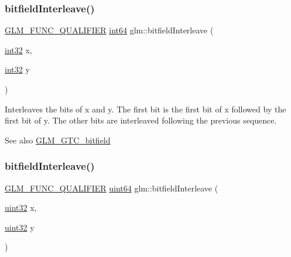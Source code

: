 \subsubsection{\texorpdfstring{bitfield\+Interleave()}{bitfieldInterleave()}\hspace{0.1cm}{\footnotesize\ttfamily [5/16]}}
{\footnotesize\ttfamily \mbox{\hyperlink{setup_8hpp_a33fdea6f91c5f834105f7415e2a64407}{G\+L\+M\+\_\+\+F\+U\+N\+C\+\_\+\+Q\+U\+A\+L\+I\+F\+I\+ER}} \mbox{\hyperlink{group__gtc__type__precision_ga435d75819cce297cc5fa21bd84ef89a5}{int64}} glm\+::bitfield\+Interleave (\begin{DoxyParamCaption}\item[{\mbox{\hyperlink{group__gtc__type__precision_ga632d8b25f6b61659f39ea4321fab92a4}{int32}}}]{x,  }\item[{\mbox{\hyperlink{group__gtc__type__precision_ga632d8b25f6b61659f39ea4321fab92a4}{int32}}}]{y }\end{DoxyParamCaption})}

Interleaves the bits of x and y. The first bit is the first bit of x followed by the first bit of y. The other bits are interleaved following the previous sequence.

\begin{DoxySeeAlso}{See also}
\mbox{\hyperlink{group__gtc__bitfield}{G\+L\+M\+\_\+\+G\+T\+C\+\_\+bitfield}} 
\end{DoxySeeAlso}
\mbox{\label{group__gtc__bitfield_ga2bc87fd66f6f8471c1a46888360cef12}} 
\subsubsection{\texorpdfstring{bitfield\+Interleave()}{bitfieldInterleave()}\hspace{0.1cm}{\footnotesize\ttfamily [6/16]}}
{\footnotesize\ttfamily \mbox{\hyperlink{setup_8hpp_a33fdea6f91c5f834105f7415e2a64407}{G\+L\+M\+\_\+\+F\+U\+N\+C\+\_\+\+Q\+U\+A\+L\+I\+F\+I\+ER}} \mbox{\hyperlink{group__gtc__type__precision_gae3632bf9b37da66233d78930dd06378a}{uint64}} glm\+::bitfield\+Interleave (\begin{DoxyParamCaption}\item[{\mbox{\hyperlink{group__gtc__type__precision_ga202b6a53c105fcb7e531f9b443518451}{uint32}}}]{x,  }\item[{\mbox{\hyperlink{group__gtc__type__precision_ga202b6a53c105fcb7e531f9b443518451}{uint32}}}]{y }\end{DoxyParamCaption})}

